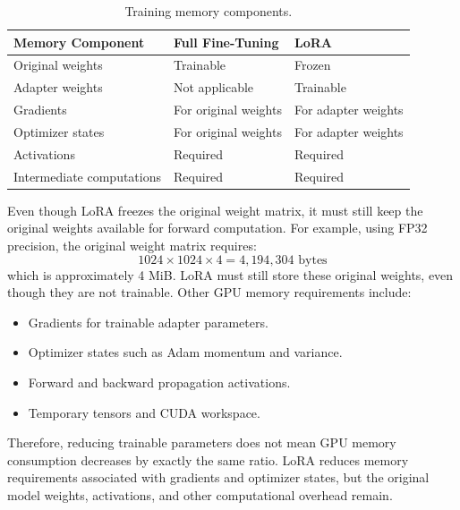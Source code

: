 \begin{table}[H]
	\centering
	\small
	\caption{Training memory components.}
	\label{tab:memory-components}
	\renewcommand{\arraystretch}{1.15}
	\begin{tabularx}{\textwidth}{@{}>{\raggedright\arraybackslash}p{}>{\raggedright\arraybackslash}X>{\raggedright\arraybackslash}X@{}}
		\toprule
		Memory Component          & Full Fine-Tuning     & LoRA                \\
		\midrule
		Original weights          & Trainable            & Frozen              \\
		Adapter weights           & Not applicable       & Trainable           \\
		Gradients                 & For original weights & For adapter weights \\
		Optimizer states          & For original weights & For adapter weights \\
		Activations               & Required             & Required            \\
		Intermediate computations & Required             & Required            \\
		\bottomrule
	\end{tabularx}
\end{table}

Even though LoRA freezes the original weight matrix, it must still keep the original weights available for forward computation. For example, using FP32 precision, the original weight matrix requires:
\[
	1024 \times 1024 \times 4 = 4,194,304 \text{ bytes}
\]
which is approximately 4 MiB. LoRA must still store these original weights, even though they are not trainable. Other GPU memory requirements include:

\begin{itemize}
	\item Gradients for trainable adapter parameters.
	\item Optimizer states such as Adam momentum and variance.
	\item Forward and backward propagation activations.
	\item Temporary tensors and CUDA workspace.
\end{itemize}

Therefore, reducing trainable parameters does not mean GPU memory consumption decreases by exactly the same ratio. LoRA reduces memory requirements associated with gradients and optimizer states, but the original model weights, activations, and other computational overhead remain.
